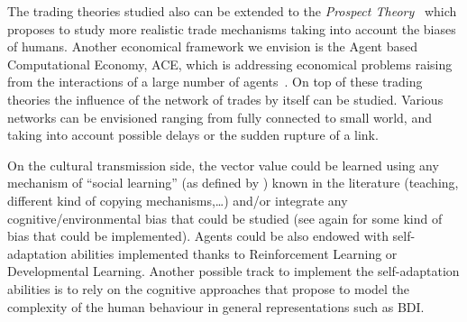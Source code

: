 \documentclass{wscpaperproc}
\begin{document}
The trading theories studied also can be extended to the \emph{Prospect Theory}~\cite{kahneman_prospect_1979} which proposes to study more realistic trade mechanisms taking into account the biases of humans. Another economical framework we envision is the Agent based Computational Economy, ACE, which is  addressing economical problems raising from the interactions of a large number of agents~\cite{tesfatsion_introduction_2001}. On top of these trading theories the influence of the network of trades by itself can be studied. Various networks can be envisioned ranging from fully connected to small world, and taking into account possible delays or the sudden rupture of a link.


On the cultural transmission side, the vector value could be learned using any mechanism of ``social learning'' (as defined by \cite{lycett_cultural_2015}) known in the literature (teaching, different kind of copying mechanisms,\ldots) and/or integrate any cognitive/environmental bias that could be studied (see again \cite{lycett_cultural_2015} for some kind of bias that could be implemented). Agents could be also endowed with self-adaptation abilities implemented thanks to Reinforcement Learning or Developmental Learning. Another possible track to implement the self-adaptation abilities is to rely on the cognitive approaches that propose to model the complexity of the human behaviour in general representations such as BDI.



  
\end{document}
